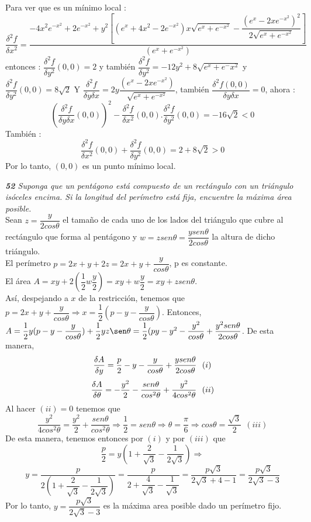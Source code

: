 \documentclass[a4paper,12pt]{article}
\begin{document}
\begin{itemize}
		Para ver que es un mínimo local :
		\[\dfrac{\delta^2 f}{\delta x^2}=\dfrac{-4x^2e^{-x^2}+2e^{-x^2}+y^2 \left[ \left( e^x+ 4x^2-2e^{-x^2}\right)x \sqrt{e^x+e^{-x^2}}- \dfrac{\left(e^x- 2xe^{-x^2} \right)^2}{2 \sqrt{e^x+ e^{-x^2}}} \right]}{\left(e^x+ e^{-x^2} \right)}\]
		entonces : $\dfrac{\delta ^2 f}{\delta y^2}(0,0) = 2 $ y también $\dfrac{\delta ^2 f}{\delta y^2}= -12y^2+ 8 \sqrt{e^x + e^-x^2}$
		y $\dfrac{\delta ^2 f}{\delta y^2}(0,0)= 8 \sqrt{2}$ Y $\dfrac{\delta^2 f}{\delta y \delta x}= 2y \dfrac{(e^x- 2xe^{-x^2})}{\sqrt{e^x+ e^{-x^2}}}$, también $\dfrac{\delta^2 f(0,0)}{\delta y \delta x}= 0$, ahora :
		\[\left(\dfrac{\delta^2 f}{\delta y \delta x}(0,0) \right)^2 - \dfrac{\delta^2 f}{\delta x^2}(0,0).\dfrac{\delta ^2 f}{\delta y^2}(0,0) = -16\sqrt{2}<0\]
		También :
		\[\dfrac{\delta ^2 f}{\delta x^2}(0,0)+\dfrac{\delta ^2 f}{\delta y^2}(0,0)= 2+8\sqrt{2}> 0\]
		Por lo tanto, $(0,0)$ es un punto mínimo local.
	\end{itemize}


	\textit{\textbf{52} Suponga que un pentágono está compuesto de un rectángulo con un triángulo isóceles encima. Si la longitud del perímetro está fija, encuentre la máxima área posible.}\\
	Sean $z = \dfrac{y}{2cos\theta}$ el tamaño de cada uno de los lados del triángulo que cubre al rectángulo que forma al pentágono y $w = zsen\theta = \dfrac{y sen\theta}{2cos\theta}$ la altura de dicho triángulo. \\
	El perímetro $p = 2x+y+2z=2x+y+\dfrac{y}{cos\theta}$, p es constante.\\
	El área $A=xy+2(\dfrac{1}{2}w\dfrac{y}{2})=xy+w\dfrac{y}{2}= xy + z sen\theta.$\\
	Así, despejando a $x$ de la restricción, tenemos que $p = 2x +y+\dfrac{y}{cos\theta} \Rightarrow x = \dfrac{1}{2}(p-y-\dfrac{y}{cos\theta})$. Entonces, $A=\dfrac{1}{2}y(p-y-\dfrac{y}{cos\theta})+\dfrac{1}{2}yz\sen\theta = \dfrac{1}{2}(py-y^2-\dfrac{y^2}{cos\theta}+\dfrac{y^2sen\theta}{2cos\theta}$. De esta manera,
	$$\deriv{A}{y} = \dfrac{p}{2}-y-\dfrac{y}{cos\theta}+ \dfrac{ysen\theta}{2cos\theta} \ \ (i)$$
	$$\deriv{A}{\theta} = -\dfrac{y^2}{2} - \dfrac{sen\theta}{cos^2\theta}+\dfrac{y^2}{4cos^2\theta} \ \ (ii)$$
	Al hacer $(ii) = 0$ tenemos que
	$$\dfrac{y^2}{4cos^2\theta} = \dfrac{y^2}{2} + \dfrac{sen\theta}{cos^2\theta} \Rightarrow \dfrac{1}{2} = sen\theta \Rightarrow \theta= \dfrac{\pi}{6} \Rightarrow cos\theta = \dfrac{\sqrt{3}}{2}\ \ (iii)$$
	De esta manera, tenemos entonces por $(i)$ y por $(iii)$ que $$\dfrac{p}{2}= y(1+\dfrac{2}{\sqrt{3}}-\dfrac{1}{2\sqrt{3}})\Rightarrow $$$$y = \dfrac{p}{2(1+\dfrac{2}{\sqrt{3}}-\dfrac{1}{2\sqrt{3}})}=\dfrac{p}{2+\dfrac{4}{\sqrt{3}}-\dfrac{1}{\sqrt{3}}}=\dfrac{p\sqrt{3}}{2\sqrt{3}+4-1}= \dfrac{p\sqrt{3}}{2\sqrt{3}-3}$$
	Por lo tanto, $y=\dfrac{p\sqrt{3}}{2\sqrt{3}-3}$ es la máxima area posible dado un perímetro fijo.
\end{document}
